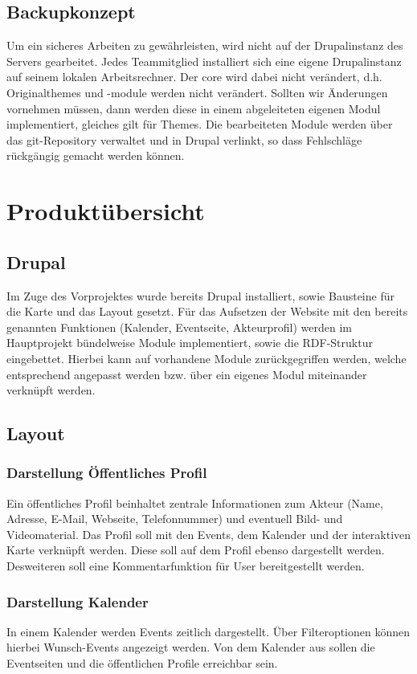 \documentclass{swp}
\begin{document}
\subsection{Backupkonzept}
Um ein sicheres Arbeiten zu gew\"ahrleisten, wird nicht auf der Drupalinstanz des Servers gearbeitet. Jedes Teammitglied installiert sich eine eigene Drupalinstanz auf seinem lokalen Arbeitsrechner. Der \glqq core\grqq{} wird dabei nicht ver\"andert, d.h. Originalthemes und -module werden nicht ver\"andert. Sollten wir \"Anderungen vornehmen m\"ussen, dann werden diese in einem abgeleiteten eigenen Modul implementiert, gleiches gilt f\"ur Themes. Die bearbeiteten Module werden \"uber das git-Repository verwaltet und in Drupal verlinkt, so dass Fehlschl\"age r\"uckg\"angig gemacht werden k\"onnen.
\section{Produkt\"ubersicht}
\subsection{Drupal}
Im Zuge des Vorprojektes wurde bereits Drupal installiert, sowie Bausteine f\"ur die Karte und das Layout gesetzt. F\"ur das Aufsetzen der Website mit den bereits genannten Funktionen (Kalender, Eventseite, Akteurprofil) werden im Hauptprojekt b\"undelweise Module implementiert, sowie die RDF-Struktur eingebettet. Hierbei kann auf vorhandene Module zur\"uckgegriffen werden, welche entsprechend angepasst werden bzw. \"uber ein eigenes Modul miteinander verkn\"upft werden. 
\subsection{Layout}
\subsubsection{Darstellung \"Offentliches Profil}
Ein \"offentliches Profil beinhaltet zentrale Informationen zum Akteur (Name, Adresse, E-Mail, Webseite, Telefonnummer) und eventuell Bild- und Videomaterial. Das Profil soll mit den Events, dem Kalender und der interaktiven Karte verkn\"upft werden. Diese soll auf dem Profil ebenso dargestellt werden. Desweiteren soll eine Kommentarfunktion f\"ur User bereitgestellt werden. 
\subsubsection{Darstellung Kalender}
In einem Kalender werden Events zeitlich dargestellt. \"Uber Filteroptionen k\"onnen hierbei \glqq Wunsch-Events\grqq{} angezeigt werden. Von dem Kalender aus sollen die Eventseiten und die \"offentlichen Profile erreichbar sein.
\end{document}
